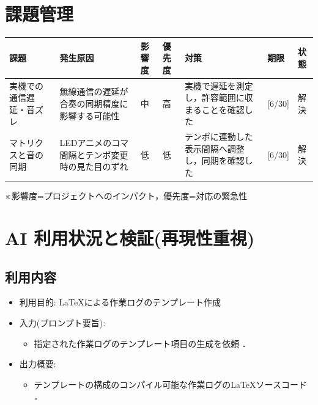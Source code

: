 \documentclass[uplatex,dvipdfmx]{jlreq}
\begin{document}
\section{課題管理}
\begin{table}[H]
    \centering
    \small
    \begin{tabular}{p{3cm}p{3cm}llp{3cm}ll}
        \toprule
        課題 & 発生原因 & 影響度 & 優先度 & 対策 & 期限 & 状態 \\
        \midrule
        実機での通信遅延・音ズレ & 無線通信の遅延が合奏の同期精度に影響する可能性 & 中 & 高 & 実機で遅延を測定し，許容範囲に収まることを確認した & [6/30] & 解決 \\
        マトリクスと音の同期 & LEDアニメのコマ間隔とテンポ変更時の見た目のずれ & 低 & 低 & テンポに連動した表示間隔へ調整し，同期を確認した & [6/30] & 解決 \\
        \bottomrule
    \end{tabular}
\end{table}
\vspace{0.5em}
\noindent ※影響度=プロジェクトへのインパクト，優先度=対応の緊急性

\section{AI 利用状況と検証(再現性重視)}
\subsection{利用内容}
\begin{itemize}
    \item 利用目的: \LaTeX による作業ログのテンプレート作成
    \item  入力(プロンプト要旨):
    \begin{itemize}
        \item 指定された作業ログのテンプレート項目の生成を依頼 ．
    \end{itemize}
    \item  出力概要:
    \begin{itemize}
        \item テンプレートの構成のコンパイル可能な作業ログの\LaTeX ソースコード ．
    \end{itemize}
\end{itemize}
\end{document}
